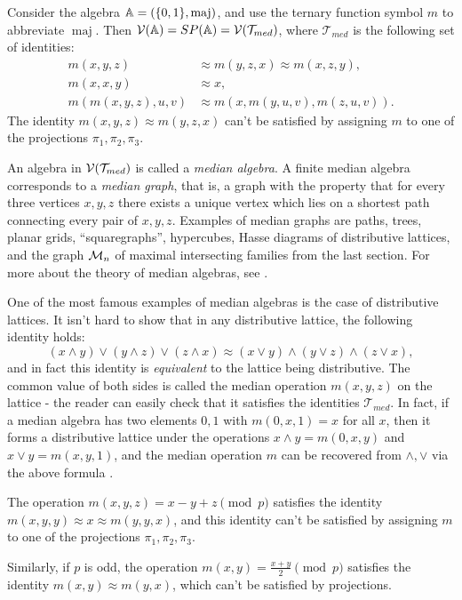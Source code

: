\documentclass[letterpaper,11pt]{article}
\DeclareMathOperator{\maj}{maj}
\begin{document}
\begin{ex} Consider the algebra $\bA = (\{0,1\}, \maj)$, and use the ternary function symbol $m$ to abbreviate $\maj$. Then $\mathcal{V}(\mathbb{A}) = SP(\mathbb{A}) = \mathcal{V}(\mathcal{T}_{med})$, where $\mathcal{T}_{med}$ is the following set of identities:
\begin{align*}
m(x,y,z) &\approx m(y,z,x) \approx m(x,z,y),\\
m(x,x,y) &\approx x,\\
m(m(x,y,z),u,v) &\approx m(x,m(y,u,v),m(z,u,v)).
\end{align*}
The identity $m(x,y,z) \approx m(y,z,x)$ can't be satisfied by assigning $m$ to one of the projections $\pi_1, \pi_2, \pi_3$.

An algebra in $\mathcal{V}(\mathcal{T}_{med})$ is called a \emph{median algebra}. A finite median algebra corresponds to a \emph{median graph}, that is, a graph with the property that for every three vertices $x,y,z$ there exists a unique vertex which lies on a shortest path connecting every pair of $x,y,z$. Examples of median graphs are paths, trees, planar grids, ``squaregraphs'', hypercubes, Hasse diagrams of distributive lattices, and the graph $\mathcal{M}_n$ of maximal intersecting families from the last section. For more about the theory of median algebras, see \cite{median-poc}.

One of the most famous examples of median algebras is the case of distributive lattices. It isn't hard to show that in any distributive lattice, the following identity holds:
\[
(x \wedge y) \vee (y \wedge z) \vee (z \wedge x) \approx (x \vee y) \wedge (y \vee z) \wedge (z \vee x),
\]
and in fact this identity is \emph{equivalent} to the lattice being distributive. The common value of both sides is called the median operation $m(x,y,z)$ on the lattice - the reader can easily check that it satisfies the identities $\mathcal{T}_{med}$. In fact, if a median algebra has two elements $0,1$ with $m(0,x,1) = x$ for all $x$, then it forms a distributive lattice under the operations $x \wedge y = m(0,x,y)$ and $x\vee y = m(x,y,1)$, and the median operation $m$ can be recovered from $\wedge, \vee$ via the above formula \cite{median-distributive}.
\end{ex}

\begin{ex} The operation $m(x,y,z) = x - y + z \pmod{p}$ satisfies the identity $m(x,y,y) \approx x \approx m(y,y,x)$, and this identity can't be satisfied by assigning $m$ to one of the projections $\pi_1, \pi_2, \pi_3$.

Similarly, if $p$ is odd, the operation $m(x,y) = \frac{x+y}{2} \pmod{p}$ satisfies the identity $m(x,y) \approx m(y,x)$, which can't be satisfied by projections.
\end{ex}
\end{document}
